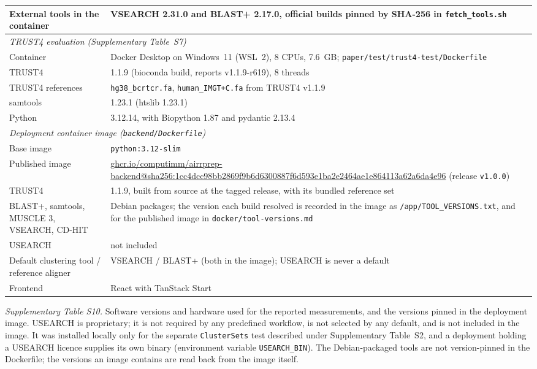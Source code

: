\documentclass[11pt]{article}
\begin{document}
\begin{landscape}
\begin{longtable}{p{}p{}}
External tools in the container & VSEARCH 2.31.0 and BLAST+ 2.17.0, official builds pinned by SHA-256 in \texttt{fetch\_tools.sh} \\
\midrule
\multicolumn{2}{l}{\textit{TRUST4 evaluation (Supplementary Table~S7)}} \\
Container & Docker Desktop on Windows~11 (WSL~2), 8 CPUs, 7.6~GB; \texttt{paper/test/trust4-test/Dockerfile} \\
TRUST4 & 1.1.9 (bioconda build, reports v1.1.9-r619), 8 threads \\
TRUST4 references & \texttt{hg38\_bcrtcr.fa}, \texttt{human\_IMGT+C.fa} from TRUST4 v1.1.9 \\
samtools & 1.23.1 (htslib 1.23.1) \\
Python & 3.12.14, with Biopython 1.87 and pydantic 2.13.4 \\
\midrule
\multicolumn{2}{l}{\textit{Deployment container image
(\texttt{backend/Dockerfile})}} \\
Base image & \texttt{python:3.12-slim} \\
Published image & \url{ghcr.io/computimm/airrprep-backend@sha256:1cc4dcc98bb2869f9b6d6300887f6d593e1ba2e2464ae1e864113a62a6da4e96} (release \texttt{v1.0.0}) \\
TRUST4 & 1.1.9, built from source at the tagged release, with its bundled reference set \\
BLAST+, samtools, MUSCLE 3, VSEARCH, CD-HIT & Debian packages; the version each build resolved is recorded in the image as \texttt{/app/TOOL\_VERSIONS.txt}, and for the published image in \texttt{docker/tool-versions.md} \\
USEARCH & not included \\
Default clustering tool / reference aligner & VSEARCH / BLAST+ (both in the image); USEARCH is never a default \\
Frontend & React with TanStack Start \\
\end{longtable}

{\small\textit{Supplementary Table S10.}
Software versions and hardware used for the reported measurements, and the
versions pinned in the deployment image. USEARCH is proprietary; it is not
required by any predefined workflow, is not selected by any default, and is not
included in the image. It was installed locally only for the separate
\texttt{ClusterSets} test described under Supplementary Table~S2, and a
deployment holding a USEARCH licence supplies its own binary (environment
variable \texttt{USEARCH\_BIN}). The Debian-packaged tools are not version-pinned
in the Dockerfile; the versions an image contains are read back from the image
itself.\par}
\end{landscape}
\end{document}
